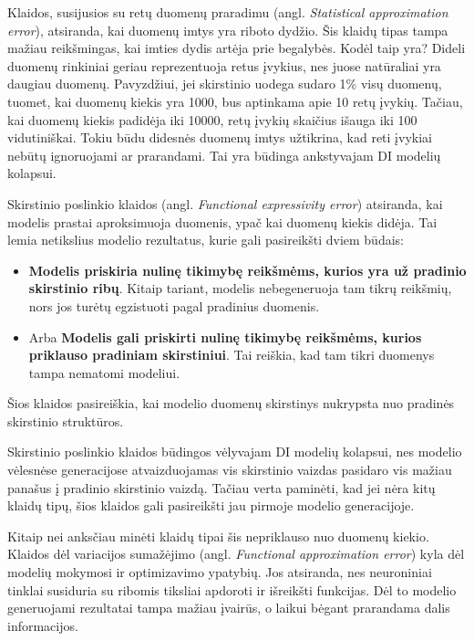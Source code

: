 \documentclass{VUMIFInfKursinis}
\begin{document}
Klaidos, susijusios su retų duomenų praradimu (angl. \textsl{Statistical approximation error}), atsiranda, kai duomenų imtys yra riboto dydžio. Šis klaidų tipas tampa mažiau reikšmingas, kai imties dydis artėja prie begalybės. Kodėl taip yra? Dideli duomenų rinkiniai geriau reprezentuoja retus įvykius, nes juose natūraliai yra daugiau duomenų. Pavyzdžiui, jei skirstinio uodega sudaro 1\% visų duomenų, tuomet, kai duomenų kiekis yra 1000, bus aptinkama apie 10 retų įvykių. Tačiau, kai duomenų kiekis padidėja iki 10000, retų įvykių skaičius išauga iki 100 vidutiniškai. Tokiu būdu didesnės duomenų imtys užtikrina, kad reti įvykiai nebūtų ignoruojami ar prarandami. Tai yra būdinga ankstyvajam DI modelių kolapsui.


Skirstinio poslinkio klaidos (angl. \textsl{Functional expressivity error}) atsiranda, kai modelis prastai aproksimuoja duomenis, ypač kai duomenų kiekis didėja. Tai lemia netikslius modelio rezultatus, kurie gali pasireikšti dviem būdais:
\begin{itemize}
\item \textbf{Modelis priskiria nulinę tikimybę reikšmėms, kurios yra už pradinio skirstinio ribų}. Kitaip tariant, modelis nebegeneruoja tam tikrų reikšmių, nors jos turėtų egzistuoti pagal pradinius duomenis. 

\item Arba \textbf{Modelis gali priskirti nulinę tikimybę reikšmėms, kurios priklauso pradiniam skirstiniui}. Tai reiškia, kad tam tikri duomenys tampa nematomi modeliui.
\end{itemize}
Šios klaidos pasireiškia, kai modelio duomenų skirstinys nukrypsta nuo pradinės skirstinio struktūros.

Skirstinio poslinkio klaidos būdingos vėlyvajam DI modelių kolapsui, nes modelio vėlesnėse generacijose atvaizduojamas vis skirstinio vaizdas pasidaro vis mažiau panašus į pradinio skirstinio vaizdą. Tačiau verta paminėti, kad jei nėra kitų klaidų tipų, šios klaidos gali pasireikšti jau pirmoje modelio generacijoje.


Kitaip nei anksčiau minėti klaidų tipai šis nepriklauso nuo duomenų kiekio. Klaidos dėl variacijos sumažėjimo (angl. \textsl{Functional approximation error}) kyla dėl modelių mokymosi ir optimizavimo ypatybių. Jos atsiranda, nes neuroniniai tinklai susiduria su ribomis tiksliai apdoroti ir išreikšti funkcijas. Dėl to modelio generuojami rezultatai tampa mažiau įvairūs, o laikui bėgant prarandama dalis informacijos.
\end{document}
